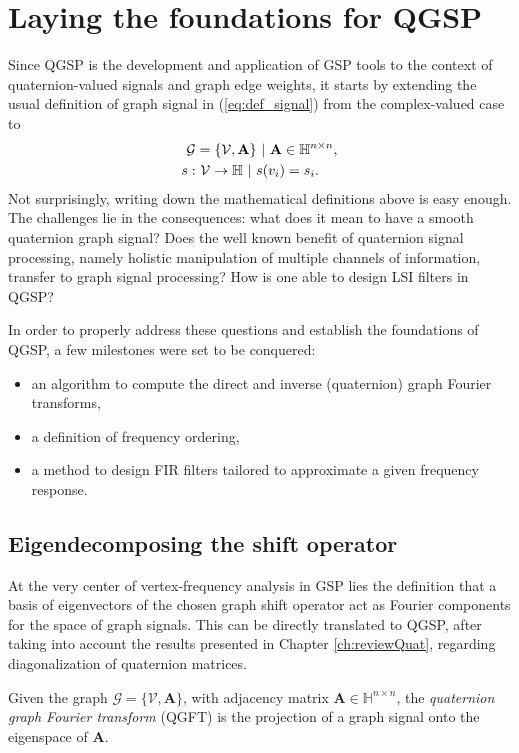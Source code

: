 \section{Laying the foundations for QGSP}

Since QGSP is the development and application of GSP tools to the context of quaternion-valued signals and graph edge weights, it starts by extending the usual definition of graph signal in (\ref{eq:def_signal}) from the complex-valued case to
\begin{align}\label{eq:qgsp_defs}
\mathcal{G} &= \{\mathcal{V}, \mathbf{A}\}  \ | \ \mathbf{A} \in \mathbb{H}^{n \times n}, \notag \\
s: &\ \mathcal{V} \rightarrow \mathbb{H} \ | \ s(v_i) = s_i.
\end{align}
Not surprisingly, writing down the mathematical definitions above is easy enough. The challenges lie in the consequences: what does it mean to have a smooth quaternion graph signal? Does the well known benefit of quaternion signal processing, namely holistic manipulation of multiple channels of information, transfer to graph signal processing? How is one able to design LSI filters in QGSP?

In order to properly address these questions and establish the foundations of QGSP, a few milestones were set to be conquered:
\begin{itemize}[noitemsep]
\item an algorithm to compute the direct and inverse (quaternion) graph Fourier transforms,
\item a definition of frequency ordering,
\item a method to design FIR filters tailored to approximate a given frequency response.
\end{itemize}

\subsection{Eigendecomposing the shift operator}
\label{subsec:eigendecomposition}
At the very center of vertex-frequency analysis in GSP lies the definition that a basis of eigenvectors of the chosen graph shift operator act as Fourier components for the space of graph signals. This can be directly translated to QGSP, after taking into account the results presented in Chapter \ref{ch:reviewQuat}, regarding diagonalization of quaternion matrices.

\begin{definition}
Given the graph $\mathcal{G} = \{\mathcal{V}, \mathbf{A}\}  $,  with adjacency matrix $ \mathbf{A} \in \mathbb{H}^{n \times n}$, the \textit{quaternion graph Fourier transform} (QGFT) is the projection of a graph signal onto the eigenspace of $\mathbf{A}$.
\end{definition}

